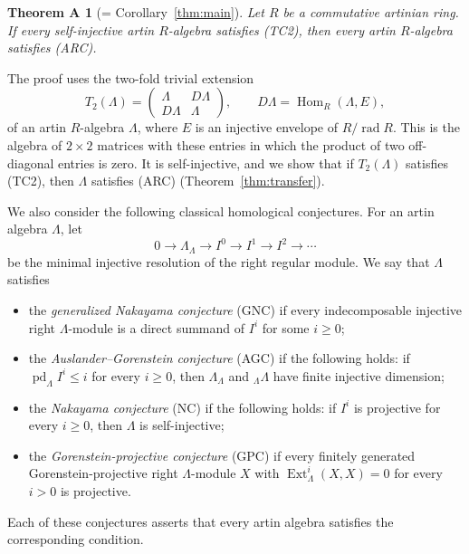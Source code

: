 \documentclass[a4paper,reqno,10pt]{amsart}
\newtheorem*{theoremA}{Theorem A}
\theoremstyle{definition}
\numberwithin{equation}{section}
\newcommand{\Hom}{\operatorname{Hom}}
\newcommand{\Ext}{\operatorname{Ext}}
\newcommand{\pd}{\operatorname{pd}}
\newcommand{\rad}{\operatorname{rad}}
\newcommand{\ARC}{\textup{(ARC)}}
\newcommand{\GNC}{\textup{(GNC)}}
\newcommand{\AGC}{\textup{(AGC)}}
\newcommand{\NC}{\textup{(NC)}}
\newcommand{\TCtwo}{\textup{(TC2)}}
\newcommand{\GPC}{\textup{(GPC)}}
\begin{document}
\begin{theoremA}[= Corollary~\ref{thm:main}]
Let $R$ be a commutative artinian ring.  If every self-injective artin
$R$-algebra satisfies \TCtwo, then every artin $R$-algebra satisfies \ARC.
\end{theoremA}

The proof uses the two-fold trivial extension
\[
 T_2(\Lambda)=\begin{pmatrix}\Lambda&D\Lambda\\D\Lambda&\Lambda\end{pmatrix},
 \qquad D\Lambda=\Hom_R(\Lambda,E),
\]
of an artin $R$-algebra $\Lambda$, where $E$ is an injective envelope of
$R/\rad R$.  This is the algebra of $2\times2$ matrices with these entries in
which the product of two off-diagonal entries is zero.  It is self-injective,
and we show that if $T_2(\Lambda)$ satisfies \TCtwo, then $\Lambda$ satisfies
\ARC{} (Theorem~\ref{thm:transfer}).

We also consider the following classical homological conjectures.  For an
artin algebra $\Lambda$, let
\begin{equation}\label{eq:injective}
 0\longrightarrow\Lambda_\Lambda\longrightarrow I^0
 \longrightarrow I^1\longrightarrow I^2\longrightarrow\cdots
\end{equation}
be the minimal injective resolution of the right regular module.  We say
that $\Lambda$ satisfies
\begin{itemize}
\item the \emph{generalized Nakayama conjecture} \GNC{} \cite{AR} if every
      indecomposable injective right $\Lambda$-module is a direct summand of
      $I^i$ for some $i\geq0$;
\item the \emph{Auslander--Gorenstein conjecture} \AGC{} \cite[\S5]{AR94} if
      the following holds: if $\pd_\Lambda I^i\leq i$ for every $i\geq0$,
      then $\Lambda_\Lambda$ and ${}_\Lambda\Lambda$ have finite injective
      dimension;
\item the \emph{Nakayama conjecture} \NC{} \cite{Nakayama} if the following
      holds: if $I^i$ is projective for every $i\geq0$, then $\Lambda$ is
      self-injective;
\item the \emph{Gorenstein-projective conjecture} \GPC{} \cite{LH} if every
      finitely generated Gorenstein-projective right $\Lambda$-module $X$
      with $\Ext_\Lambda^i(X,X)=0$ for every $i>0$ is projective.
\end{itemize}
Each of these conjectures asserts that every artin algebra satisfies the
corresponding condition.
\end{document}
